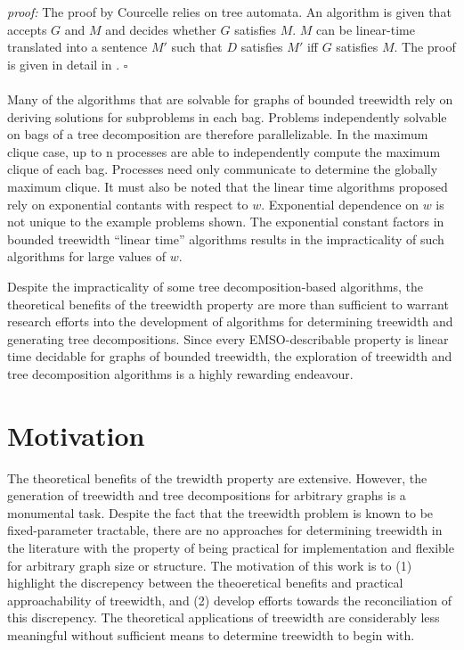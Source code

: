 \documentclass[12pt,conference]{IEEEtran}
\theoremstyle{plain}
\begin{document}
\textit{proof:} 
  The proof by Courcelle relies on tree automata. An algorithm is given that accepts $G$ and $M$ and decides whether $G$ satisfies $M$. $M$ can be linear-time translated into a sentence $M'$ such that $D$ satisfies $M'$ iff $G$ satisfies $M$. The proof is given in detail in \cite{courcelle-original}. $\square$
\\
\\
Many of the algorithms that are solvable for graphs of bounded treewidth rely on deriving solutions for subproblems in each bag. Problems independently solvable on bags of a tree decomposition are therefore parallelizable. In the maximum clique case, up to n processes are able to independently compute the maximum clique of each bag. Processes need only communicate to determine the globally maximum clique. It must also be noted that the linear time algorithms proposed rely on exponential contants with respect to $w$. Exponential dependence on $w$ is not unique to the example problems shown. The exponential constant factors in bounded treewidth ``linear time'' algorithms results in the impracticality of such algorithms for large values of $w$.

Despite the impracticality of some tree decomposition-based algorithms, the theoretical benefits of the treewidth property are more than sufficient to warrant research efforts into the development of algorithms for determining treewidth and generating tree decompositions. Since every EMSO-describable property is linear time decidable for graphs of bounded treewidth, the exploration of treewidth and tree decomposition algorithms is a highly rewarding endeavour.

\section{Motivation}

The theoretical benefits of the trewidth property are extensive. However, the generation of treewidth and tree decompositions for arbitrary graphs is a monumental task. Despite the fact that the treewidth problem is known to be fixed-parameter tractable, there are no approaches for determining treewidth in the literature with the property of being practical for implementation and flexible for arbitrary graph size or structure. The motivation of this work is to (1) highlight the discrepency between the theoeretical benefits and practical approachability of treewidth, and (2) develop efforts towards the reconciliation of this discrepency. The theoretical applications of treewidth are considerably less meaningful without sufficient means to determine treewidth to begin with.
\end{document}
